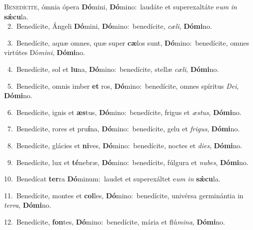 \lettrine{\initial\textcolor{\initialcolor}{B}}{enedícite,} ómnia ópera \textbf{Dó}\-mini, \textbf{Dó}\-mino:~\star laudáte et superexaltáte e\textit{um} \textit{in} \textbf{sǽ}\-\textbf{cu}la.\\
{\numbfont\textcolor{\numbcolor}{~2.}}~Benedícite, Ángeli \textbf{Dó}\-mini, \textbf{Dó}\-mino:~\star benedícite, \textit{cæ}\-\textit{li}, \textbf{Dó}\-\textbf{mi}no.\par
{\numbfont\textcolor{\numbcolor}{~3.}}~Benedícite, aquæ omnes, quæ super \textbf{cæ}\-los sunt, \textbf{Dó}\-mino:~\star benedícite, omnes virtútes Dó\-\textit{mi}\-\textit{ni}, \textbf{Dó}\-\textbf{mi}no.\par
{\numbfont\textcolor{\numbcolor}{~4.}}~Benedícite, sol et \textbf{lu}\-na, \textbf{Dó}\-mino:~\star benedícite, stellæ \textit{cæ}\-\textit{li}, \textbf{Dó}\-\textbf{mi}no.\par
{\numbfont\textcolor{\numbcolor}{~5.}}~Benedícite, omnis imber \textbf{et} ros, \textbf{Dó}\-mino:~\star benedícite, omnes spíritus \textit{De}\-\textit{i}, \textbf{Dó}\-\textbf{mi}no.\par
{\numbfont\textcolor{\numbcolor}{~6.}}~Benedícite, ignis et \textbf{æs}\-tus, \textbf{Dó}\-mino:~\star benedícite, frigus et \textit{æs}\-\textit{tus}, \textbf{Dó}\-\textbf{mi}no.\par
{\numbfont\textcolor{\numbcolor}{~7.}}~Benedícite, rores et pru\-\textbf{í}\-na, \textbf{Dó}\-mino:~\star benedícite, gelu et \textit{fri}\-\textit{gus}, \textbf{Dó}\-\textbf{mi}no.\par
{\numbfont\textcolor{\numbcolor}{~8.}}~Benedícite, glácies et \textbf{ni}\-ves, \textbf{Dó}\-mino:~\star benedícite, noctes et \textit{di}\-\textit{es}, \textbf{Dó}\-\textbf{mi}no.\par
{\numbfont\textcolor{\numbcolor}{~9.}}~Benedícite, lux et \textbf{té}\-nebræ, \textbf{Dó}\-mino:~\star benedícite, fúlgura et \textit{nu}\-\textit{bes}, \textbf{Dó}\-\textbf{mi}no.\par
{\numbfont\textcolor{\numbcolor}{10.}}~Benedícat \textbf{ter}\-ra \textbf{Dó}\-minum:~\star laudet et superexáltet e\textit{um} \textit{in} \textbf{sǽ}\-\textbf{cu}la.\par
{\numbfont\textcolor{\numbcolor}{11.}}~Benedícite, montes et \textbf{col}\-les, \textbf{Dó}\-mino:~\star benedícite, univérsa germinántia in \textit{ter}\-\textit{ra}, \textbf{Dó}\-\textbf{mi}no.\par
{\numbfont\textcolor{\numbcolor}{12.}}~Benedícite, \textbf{fon}\-tes, \textbf{Dó}\-mino:~\star benedícite, mária et flú\-\textit{mi}\-\textit{na}, \textbf{Dó}\-\textbf{mi}no.\par

